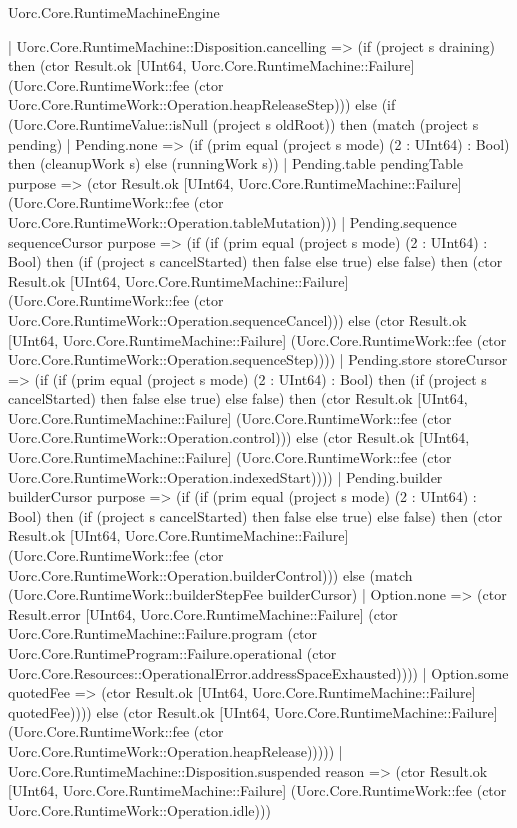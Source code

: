 \begin{lexlean}{Uorc.Core.RuntimeMachineEngine}
\begin{semanticmodule}
{    | Uorc.Core.RuntimeMachine::Disposition.cancelling => (if (project s draining) then (ctor Result.ok [UInt64, Uorc.Core.RuntimeMachine::Failure] (Uorc.Core.RuntimeWork::fee (ctor Uorc.Core.RuntimeWork::Operation.heapReleaseStep))) else (if (Uorc.Core.RuntimeValue::isNull (project s oldRoot)) then (match (project s pending)
      | Pending.none => (if (prim equal (project s mode) (2 : UInt64) : Bool) then (cleanupWork s) else (runningWork s))
      | Pending.table pendingTable purpose => (ctor Result.ok [UInt64, Uorc.Core.RuntimeMachine::Failure] (Uorc.Core.RuntimeWork::fee (ctor Uorc.Core.RuntimeWork::Operation.tableMutation)))
      | Pending.sequence sequenceCursor purpose => (if (if (prim equal (project s mode) (2 : UInt64) : Bool) then (if (project s cancelStarted) then false else true) else false) then (ctor Result.ok [UInt64, Uorc.Core.RuntimeMachine::Failure] (Uorc.Core.RuntimeWork::fee (ctor Uorc.Core.RuntimeWork::Operation.sequenceCancel))) else (ctor Result.ok [UInt64, Uorc.Core.RuntimeMachine::Failure] (Uorc.Core.RuntimeWork::fee (ctor Uorc.Core.RuntimeWork::Operation.sequenceStep))))
      | Pending.store storeCursor => (if (if (prim equal (project s mode) (2 : UInt64) : Bool) then (if (project s cancelStarted) then false else true) else false) then (ctor Result.ok [UInt64, Uorc.Core.RuntimeMachine::Failure] (Uorc.Core.RuntimeWork::fee (ctor Uorc.Core.RuntimeWork::Operation.control))) else (ctor Result.ok [UInt64, Uorc.Core.RuntimeMachine::Failure] (Uorc.Core.RuntimeWork::fee (ctor Uorc.Core.RuntimeWork::Operation.indexedStart))))
      | Pending.builder builderCursor purpose => (if (if (prim equal (project s mode) (2 : UInt64) : Bool) then (if (project s cancelStarted) then false else true) else false) then (ctor Result.ok [UInt64, Uorc.Core.RuntimeMachine::Failure] (Uorc.Core.RuntimeWork::fee (ctor Uorc.Core.RuntimeWork::Operation.builderControl))) else (match (Uorc.Core.RuntimeWork::builderStepFee builderCursor)
        | Option.none => (ctor Result.error [UInt64, Uorc.Core.RuntimeMachine::Failure] (ctor Uorc.Core.RuntimeMachine::Failure.program (ctor Uorc.Core.RuntimeProgram::Failure.operational (ctor Uorc.Core.Resources::OperationalError.addressSpaceExhausted))))
        | Option.some quotedFee => (ctor Result.ok [UInt64, Uorc.Core.RuntimeMachine::Failure] quotedFee)))) else (ctor Result.ok [UInt64, Uorc.Core.RuntimeMachine::Failure] (Uorc.Core.RuntimeWork::fee (ctor Uorc.Core.RuntimeWork::Operation.heapRelease)))))
    | Uorc.Core.RuntimeMachine::Disposition.suspended reason => (ctor Result.ok [UInt64, Uorc.Core.RuntimeMachine::Failure] (Uorc.Core.RuntimeWork::fee (ctor Uorc.Core.RuntimeWork::Operation.idle)))
}
\end{semanticmodule}
\end{lexlean}
